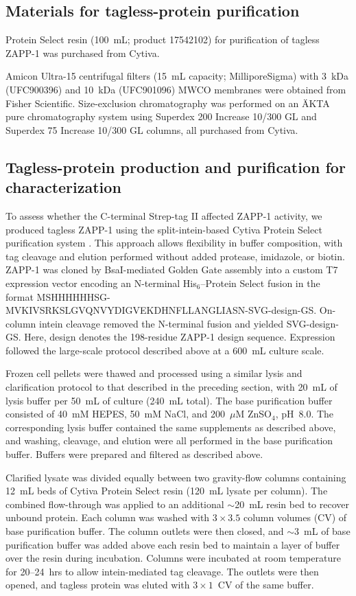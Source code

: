 \subsection{Materials for tagless-protein purification}

Protein Select resin (100~mL; product 17542102) for purification of tagless ZAPP-1 was purchased from Cytiva.

Amicon Ultra-15 centrifugal filters (15~mL capacity; MilliporeSigma) with 3~kDa (UFC900396) and 10~kDa (UFC901096) MWCO membranes were obtained from Fisher Scientific. Size-exclusion chromatography was performed on an \"{A}KTA pure chromatography system using Superdex 200 Increase 10/300 GL and Superdex 75 Increase 10/300 GL columns, all purchased from Cytiva.

\subsection{Tagless-protein production and purification for characterization}

To assess whether the C-terminal Strep-tag II affected ZAPP-1 activity, we produced tagless ZAPP-1 using the split-intein-based Cytiva Protein Select purification system \citep{clifford2024production}. This approach allows flexibility in buffer composition, with tag cleavage and elution performed without added protease, imidazole, or biotin. ZAPP-1 was cloned by BsaI-mediated Golden Gate assembly into a custom T7 expression vector encoding an N-terminal His$_6$--Protein Select fusion in the format MSHHHHHHSG-MVKIVSRKSLGVQNVYDIGVEKDHNFLLANGLIASN-SVG-design-GS. On-column intein cleavage removed the N-terminal fusion and yielded SVG-design-GS. Here, design denotes the 198-residue ZAPP-1 design sequence. Expression followed the large-scale protocol described above at a 600~mL culture scale.

Frozen cell pellets were thawed and processed using a similar lysis and clarification protocol to that described in the preceding section, with 20~mL of lysis buffer per 50~mL of culture (240~mL total). The base purification buffer consisted of 40~mM HEPES, 50~mM NaCl, and 200~$\mu$M ZnSO$_4$, pH~8.0. The corresponding lysis buffer contained the same supplements as described above, and washing, cleavage, and elution were all performed in the base purification buffer. Buffers were prepared and filtered as described above.

Clarified lysate was divided equally between two gravity-flow columns containing 12~mL beds of Cytiva Protein Select resin (120~mL lysate per column). The combined flow-through was applied to an additional $\sim$20~mL resin bed to recover unbound protein. Each column was washed with $3 \times 3.5$ column volumes (CV) of base purification buffer. The column outlets were then closed, and $\sim$3~mL of base purification buffer was added above each resin bed to maintain a layer of buffer over the resin during incubation. Columns were incubated at room temperature for 20--24~hrs to allow intein-mediated tag cleavage. The outlets were then opened, and tagless protein was eluted with $3 \times 1$~CV of the same buffer.


